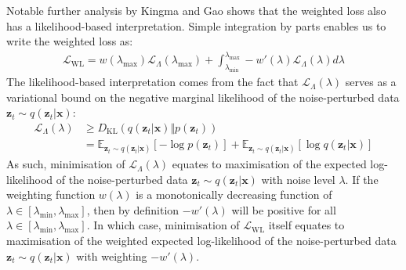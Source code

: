 \documentclass[ oneside,%
                    author={George Herbert},
                    degree={MSci},
                     title={Diffusion Models for Time-Evolving Precipitation Fields},
                  subtitle={}]{dissertation}
\begin{document}
Notable further analysis by Kingma and Gao \cite{Understanding_Diffusion_Objective_Kingma} shows that the weighted loss also has a likelihood-based interpretation. Simple integration by parts enables us to write the weighted loss as:
\begin{align}
      \mathcal{L}_{\mathrm{WL}} = w(\lambda_{\max})\mathcal{L}_\Lambda(\lambda_{\max}) + \int_{\lambda_{\min}}^{\lambda_{\max}}-w'(\lambda)\mathcal{L}_\Lambda(\lambda) d\lambda
\end{align}
The likelihood-based interpretation comes from the fact that $\mathcal{L}_\Lambda(\lambda)$ serves as a variational bound on the negative marginal likelihood of the noise-perturbed data $\mathbf{z}_t\sim q(\mathbf{z}_t|\mathbf{x})$:
\begin{align}
      \mathcal{L}_\Lambda(\lambda)&\ge D_{\mathrm{KL}}(q(\mathbf{z}_t|\mathbf{x})\Vert p(\mathbf{z}_t))\\
      &=\mathbb{E}_{\mathbf{z}_t\sim q(\mathbf{z}_t|\mathbf{x})}\left[-\log p(\mathbf{z}_t)\right]+\mathbb{E}_{\mathbf{z}_t\sim q(\mathbf{z}_t|\mathbf{x})}\left[\log q(\mathbf{z}_t|\mathbf{x})\right]
\end{align}
As such, minimisation of $\mathcal{L}_\Lambda(\lambda)$ equates to maximisation of the expected log-likelihood of the noise-perturbed data $\mathbf{z}_t\sim q(\mathbf{z}_t|\mathbf{x})$ with noise level $\lambda$. If the weighting function $w(\lambda)$ is a monotonically decreasing function of $\lambda\in [\lambda_{\min}, \lambda_{\max}]$, then by definition $-w'(\lambda)$ will be positive for all $\lambda\in [\lambda_{\min}, \lambda_{\max}]$. In which case, minimisation of $\mathcal{L}_{\mathrm{WL}}$ itself equates to maximisation of the weighted expected log-likelihood of the noise-perturbed data $\mathbf{z}_t\sim q(\mathbf{z}_t|\mathbf{x})$ with weighting $-w'(\lambda)$. 
\end{document}
